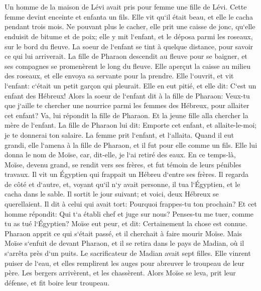 \chapter{}

\verse Un homme de la maison de Lévi avait pris pour femme une fille de Lévi. 
\verse Cette femme devint enceinte et enfanta un fils. Elle vit qu`il était beau, et elle le cacha pendant trois mois. 
\verse Ne pouvant plus le cacher, elle prit une caisse de jonc, qu`elle enduisit de bitume et de poix; elle y mit l`enfant, et le déposa parmi les roseaux, sur le bord du fleuve. 
\verse La soeur de l`enfant se tint à quelque distance, pour savoir ce qui lui arriverait. 
\verse La fille de Pharaon descendit au fleuve pour se baigner, et ses compagnes se promenèrent le long du fleuve. Elle aperçut la caisse au milieu des roseaux, et elle envoya sa servante pour la prendre. 
\verse Elle l`ouvrit, et vit l`enfant: c`était un petit garçon qui pleurait. Elle en eut pitié, et elle dit: C`est un enfant des Hébreux! 
\verse Alors la soeur de l`enfant dit à la fille de Pharaon: Veux-tu que j`aille te chercher une nourrice parmi les femmes des Hébreux, pour allaiter cet enfant? 
\verse Va, lui répondit la fille de Pharaon. Et la jeune fille alla chercher la mère de l`enfant. 
\verse La fille de Pharaon lui dit: Emporte cet enfant, et allaite-le-moi; je te donnerai ton salaire. La femme prit l`enfant, et l`allaita. 
\verse Quand il eut grandi, elle l`amena à la fille de Pharaon, et il fut pour elle comme un fils. Elle lui donna le nom de Moïse, car, dit-elle, je l`ai retiré des eaux. 
\verse En ce temps-là, Moïse, devenu grand, se rendit vers ses frères, et fut témoin de leurs pénibles travaux. Il vit un Égyptien qui frappait un Hébreu d`entre ses frères. 
\verse Il regarda de côté et d`autre, et, voyant qu`il n`y avait personne, il tua l`Égyptien, et le cacha dans le sable. 
\verse Il sortit le jour suivant; et voici, deux Hébreux se querellaient. Il dit à celui qui avait tort: Pourquoi frappes-tu ton prochain? 
\verse Et cet homme répondit: Qui t`a établi chef et juge sur nous? Penses-tu me tuer, comme tu as tué l`Égyptien? Moïse eut peur, et dit: Certainement la chose est connue. 
\verse Pharaon apprit ce qui s`était passé, et il cherchait à faire mourir Moïse. Mais Moïse s`enfuit de devant Pharaon, et il se retira dans le pays de Madian, où il s`arrêta près d`un puits. 
\verse Le sacrificateur de Madian avait sept filles. Elle vinrent puiser de l`eau, et elles remplirent les auges pour abreuver le troupeau de leur père. 
\verse Les bergers arrivèrent, et les chassèrent. Alors Moïse se leva, prit leur défense, et fit boire leur troupeau. 
